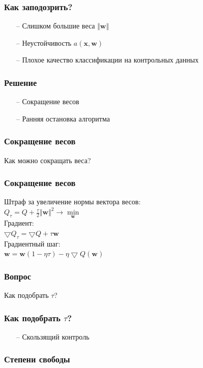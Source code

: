 \documentclass[12pt]{beamer}
\begin{document}
\begin{frame}\frametitle{Как заподозрить?}
\begin{itemize}
\item[--] Слишком большие веса $\Vert \mathbf{w} \Vert$
\item[--] Неустойчивость $a(\mathbf{x},\mathbf{w})$
\item[--] Плохое качество классификации на контрольных данных
\end{itemize}
\end{frame}

\begin{frame}\frametitle{Решение}
\begin{itemize}
\item[--] Сокращение весов
\item[--] Ранняя остановка алгоритма
\end{itemize}
\end{frame}

\begin{frame}\frametitle{Сокращение весов}
Как можно сокращать веса?
\end{frame}

\begin{frame}\frametitle{Сокращение весов}
Штраф за увеличение нормы вектора весов:\\
$Q_{\tau} = Q + \frac{\tau}{2}\Vert \mathbf{w} \Vert^2 \rightarrow \min\limits_{\mathbf{w}}$\\
\vspace{5mm}
Градиент:\\
$\bigtriangledown Q_{\tau} = \bigtriangledown Q + \tau \mathbf{w}$\\
\vspace{5mm}
Градиентный шаг:\\
$\mathbf{w} = \mathbf{w}(1-\eta \tau) - \eta \bigtriangledown Q(\mathbf{w})$
\end{frame}

\begin{frame}\frametitle{Вопрос}
Как подобрать $\tau$?
\end{frame}

\begin{frame}\frametitle{Как подобрать $\tau$?}
\begin{itemize}
\item[--] Скользящий контроль
\end{itemize}
\end{frame}

\begin{frame}\frametitle{Степени свободы}

\end{frame}
\end{document}
